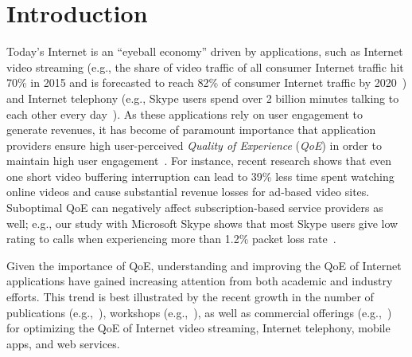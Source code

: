 \chapter{Introduction}


Today's Internet is an ``eyeball economy'' driven by applications, such 
as Internet video streaming (e.g., the share of video traffic of all consumer Internet 
traffic  hit 70\% in 2015 and is forecasted to reach 82\% of consumer Internet traffic by 
2020~\cite{cisco-forecast-2015}) and Internet telephony (e.g., Skype users spend over 
2 billion minutes talking to each other every day~\cite{skype-2-billion-minutes}). 
As these applications rely on user engagement to generate revenues, 
it has become of paramount importance that
application providers ensure high user-perceived 
{\em Quality of Experience} ({\em QoE}) in order to maintain high user 
engagement~\cite{sigcomm13athula,akamai-imc12}.
For instance, recent research shows that even one short video buffering 
interruption can lead to 39\% less time spent watching online videos and 
cause substantial  revenue losses for ad-based video sites. 
Suboptimal QoE can negatively affect subscription-based 
service providers as well; e.g., our study with Microsoft Skype 
shows that most Skype users give low rating to calls when experiencing more than
1.2\% packet loss rate~\cite{via}.

Given the importance of QoE, understanding and improving the QoE of Internet applications 
have gained increasing attention from both academic and industry efforts. 
This trend is best illustrated by the recent growth in the number of 
publications (e.g.,~\cite{sigcomm13athula,sigcomm12,
wang2014speedy,sigcomm11,eona,akamai-imc12}), workshops 
(e.g.,~\cite{workshop-wmust,workshop-fhmn,workshop-qoe}), 
as well as commercial offerings (e.g.,~\cite{conviva,artizanetworks}) for optimizing the QoE 
of Internet video streaming, Internet telephony, mobile 
apps, and web services.

